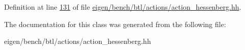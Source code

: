Definition at line \hyperlink{eigen_2bench_2btl_2actions_2action__hessenberg_8hh_source_l00131}{131} of file \hyperlink{eigen_2bench_2btl_2actions_2action__hessenberg_8hh_source}{eigen/bench/btl/actions/action\+\_\+hessenberg.\+hh}.



The documentation for this class was generated from the following file\+:\begin{DoxyCompactItemize}
\item 
eigen/bench/btl/actions/action\+\_\+hessenberg.\+hh\end{DoxyCompactItemize}
